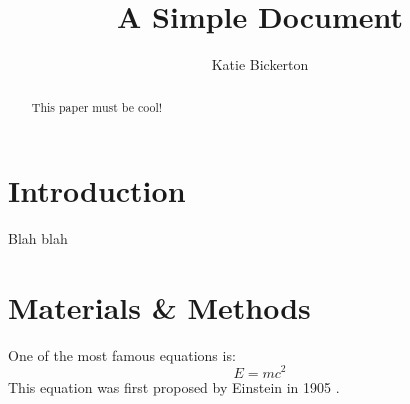 \documentclass[12pt]{article}
\title{A Simple Document}
\author{Katie Bickerton}
\date{}
\begin{document}
    \maketitle

    \begin{abstract}
        This paper must be cool!
    \end{abstract}

    \section{Introduction}
        Blah blah

    \section{Materials \& Methods}
    One of the most famous equations is:
    \begin{equation}
        E = mc^2
    \end{equation}
    This equation was first proposed by Einstein in 1905
    \cite{einstein1905does}.

    
    
\end{document}

